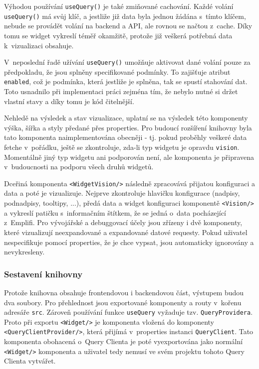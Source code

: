 \documentclass[czech, bc, kiv, he, iso690numb, viewonly]{fasthesis} %
\begin{document}
Výhodou používání \texttt{useQuery()} je také zmiňované cachování. Každé volání \texttt{useQuery()} má svůj klíč, a jestliže již data byla jednou žádána s~tímto klíčem,
nebude se provádět volání na backend a API, ale rovnou se načtou z~cache. Díky tomu se widget vykreslí téměř okamžitě, protože již veškerá potřebná data k~vizualizaci obsahuje. 

V~neposlední řadě užívání \texttt{useQuery()} umožňuje aktivovat dané volání pouze za předpokladu, že jsou splněny specifikované podmínky. To zajišťuje atribut \texttt{enabled},
což je podmínka, která jestliže je splněna, tak se spustí stahování dat. Toto usnadnilo při implementaci práci zejména tím, že nebylo nutné si držet vlastní stavy a díky tomu
je kód čitelnější.

Nehledě na výsledek a stav vizualizace, uplatní se na výsledek této komponenty výška, šířka a styly předané přes properties. Pro budoucí rozšíření knihovny byla tato komponenta
naimplementována obecněji - tj. pokud proběhly veškeré data fetche v~pořádku, ještě se zkontroluje, zda-li typ widgetu je opravdu \texttt{vision}. Momentálně jiný typ widgetu ani podporován není,
ale komponenta je připravena v~budoucnosti na podporu všech druhů widgetů.


Dceřiná komponenta \texttt{<WidgetVision/>} následně zpracovává přijatou konfiguraci a data a poté je vizualizuje. Nejprve zkontroluje hlavičku konfigurace (nadpisy, podnadpisy, tooltipy, ...),
předá data a widget konfiguraci komponentě \texttt{<Vision/>} a vykreslí patičku s~informačním štítkem, že se jedná o~data pocházející z~Emplifi. Pro vývojářské a debuggovací účely jsou 
zřízeny i dvě komponenty, které vizualizují neexpandované a expandované datové requesty. Pokud uživatel nespecifikuje pomocí properties, že je chce vypsat, jsou automaticky ignorovány a nevykresleny.

\subsubsection{Sestavení knihovny}

Protože knihovna obsahuje frontendovou i backendovou část, výstupem budou dva soubory. Pro přehlednost jsou exportované komponenty a routy v~kořenu adresáře \texttt{src}. Zároveň používání
funkce \texttt{useQuery} vyžaduje tzv. \texttt{QueryProvidera}. Proto při exportu \texttt{<Widget/>} je komponenta vložená do komponenty \texttt{<QueryClientProvider/>}, která přijímá v~properties instanci
\texttt{QueryClient}. Tato komponenta obohacená o~Query Clienta je poté vyexportována jako normální \texttt{<Widget/>} komponenta a uživatel tedy nemusí ve svém projektu tohoto Query Clienta vytvářet.
\end{document}
